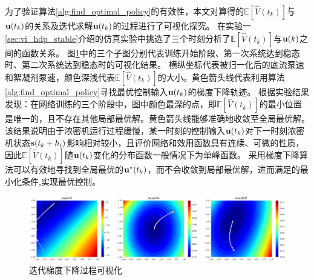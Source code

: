 为了验证算法\ref{alg:find_optimal_policy}的有效性，本文对算得的$\mathbb{E}[\hat{V}(t_k)]$与${\mathbf u}(t_k)$的关系及迭代求解$\mathbf u({t_k})$的过程进行了可视化探究。
在实验一\ref{sec:vi_hdp_stable}介绍的仿真实验中挑选了三个时刻分析了$\mathbb{E}[\hat{V}(t_k)]$与${\mathbf u}(k)$之间的函数关系。
图\ref{fig:J_u_cmp}中的三个子图分别代表训练开始阶段、第一次系统达到稳态时、第二次系统达到稳态时的可视化结果。
横纵坐标代表被归一化后的底流泵速和絮凝剂泵速，颜色深浅代表$\mathbb{E}[\hat{V}(t_k)]$的大小。黄色箭头线代表利用算法\ref{alg:find_optimal_policy}寻找最优控制输入${\mathbf
u}(t_k)$的梯度下降轨迹。
根据实验结果发现：在网络训练的三个阶段中，图中颜色最深的点，即$\mathbb{E}[\hat{V}(t_k)]$的最小位置是唯一的，且不存在其他局部最优解。黄色箭头线能够准确地收敛至全局最优解。该结果说明由于浓密机运行过程缓慢，某一时刻的控制输入${\mathbf
u}(t_k)$对下一时刻浓密机状态$\mathbf
s(t_k+h_i)$影响相对较小，且评价网络和效用函数具有连续、可微的性质，因此$\mathbb{E}[\hat{V}(t_k)]$随${\mathbf
u}(t_k)$变化的分布函数一般情况下为单峰函数。
采用梯度下降算法可以有效地寻找到全局最优的$\mathbf u^*(t_k)$，而不会收敛到局部最优解，进而满足的最小化条件,实现最优控制。

\begin{figure}[!ht]
    \centering
    \includegraphics[width=\linewidth]{figures/chapter6/fig4.eps}
    \caption{迭代梯度下降过程可视化}
\label{fig:J_u_cmp}
\end{figure}
